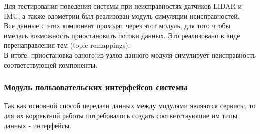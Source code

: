 Для тестирования поведения системы при неисправностях датчиков LIDAR и IMU, а также одометрии был реализован модуль симуляции неисправностей.\\
Все данные с этих компонент проходят через этот модуль, для того чтобы имелась возможность приостановить потоки данных. Это реализовано в виде перенаправления тем (topic remappings). \\
В итоге, приостановка одного из узлов данного модуля симулирует неисправность соответствующей компоненты.

\subsubsection{Модуль пользовательских интерфейсов системы}

Так как основной способ передачи данных между модулями являются сервисы, то для их корректной работы потребовалось создать соответствующие им типы данных - интерфейсы.

\begin{table}[h]
    \centering
    \caption{Описание реализованных интерфейсов для системы контроля}
    \label{tab:my_label}
\end{table}


